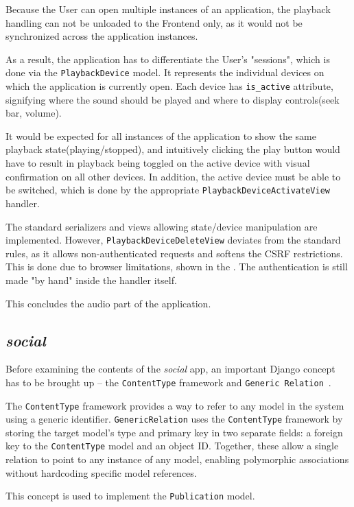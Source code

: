 Because the User can open multiple instances of an application, the playback handling can not be
unloaded to the Frontend only, as it would not be synchronized across the application instances.

As a result, the application has to differentiate the User's "sessions", which is done
via the \texttt{PlaybackDevice} model.
It represents the individual devices on which the application is currently open.
Each device has \texttt{is\_active} attribute, signifying where the sound should be played and where
to display controls(seek bar, volume).

It would be expected for all instances of the application to show the same playback state(playing/stopped),
and intuitively clicking the play button would have to result in playback being toggled on the active device with
visual confirmation on all other devices. In addition, the active device must be able to be switched, which is done
by the appropriate \texttt{PlaybackDeviceActivateView} handler.

The standard serializers and views allowing state/device manipulation are implemented.
However, \texttt{PlaybackDeviceDeleteView} deviates from the standard rules, as it allows non-authenticated requests
and softens the CSRF restrictions. This is done due to browser limitations, shown in the .
The authentication is still made "by hand" inside the handler itself.

This concludes the audio part of the application.

\subsection{\textit{social}}\label{subsec:social}
Before examining the contents of the \textit{social} app, an important Django concept
has to be brought up -- the \texttt{ContentType} framework and \texttt{Generic Relation}~\cite{djangocontenttype}.

The \texttt{ContentType} framework provides a way to refer to any model in the system
using a generic identifier.
\texttt{GenericRelation} uses the \texttt{ContentType} framework by storing the target
model’s type and primary key in two separate fields: a foreign key to the
\texttt{ContentType} model and an object ID.
Together, these allow a single relation to point to any instance of any model,
enabling polymorphic associations without hardcoding specific model references.

This concept is used to implement the \texttt{Publication} model.

